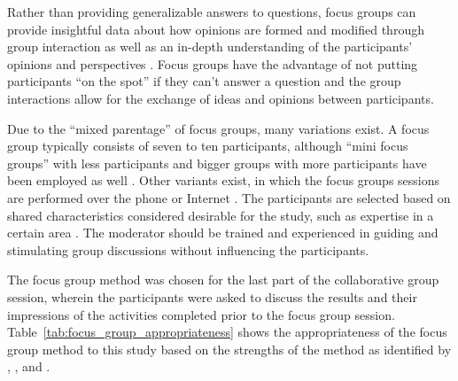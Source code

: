Rather than providing generalizable answers to questions, focus groups can provide insightful data about how opinions are formed and modified through group interaction as well as an in-depth understanding of the participants' opinions and perspectives \citep{Barbour2008,Edmunds1999}. Focus groups have the advantage of not putting participants ``on the spot'' if they can't answer a question \citep{Barbour2008} and the group interactions allow for the exchange of ideas and opinions between participants.

Due to the ``mixed parentage'' \citep{Barbour2008} of focus groups, many variations exist. A focus group typically consists of seven to ten participants, although ``mini focus groups'' with less participants and bigger groups with more participants have been employed as well \citep{Marshall1999,Edmunds1999}. Other variants exist, in which the focus groups sessions are performed over the phone or Internet \citep{Edmunds1999}. The participants are selected based on shared characteristics considered desirable for the study, such as expertise in a certain area \citep{Marshall1999}. The moderator should be trained and experienced in guiding and stimulating group discussions without influencing the participants.

The focus group method was chosen for the last part of the collaborative group session, wherein the participants were asked to discuss the results and their impressions of the activities completed prior to the focus group session. Table~\ref{tab:focus_group_appropriateness} shows the appropriateness of the focus group method to this study based on the strengths of the method as identified by \citet{Marshall1999}, \citet{Edmunds1999}, and \citet{Morgan1998}.

